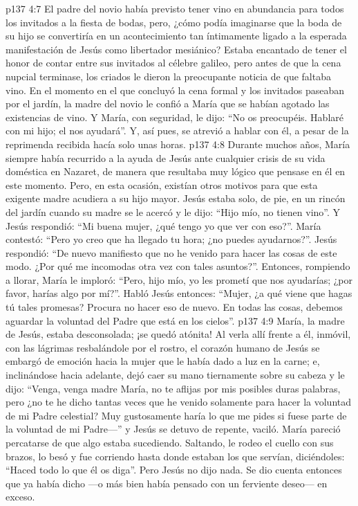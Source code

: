 \vs p137 4:7 \pc El padre del novio había previsto tener vino en abundancia para todos los invitados a la fiesta de bodas, pero, ¿cómo podía imaginarse que la boda de su hijo se convertiría en un acontecimiento tan íntimamente ligado a la esperada manifestación de Jesús como libertador mesiánico? Estaba encantado de tener el honor de contar entre sus invitados al célebre galileo, pero antes de que la cena nupcial terminase, los criados le dieron la preocupante noticia de que faltaba vino. En el momento en el que concluyó la cena formal y los invitados paseaban por el jardín, la madre del novio le confió a María que se habían agotado las existencias de vino. Y María, con seguridad, le dijo: “No os preocupéis. Hablaré con mi hijo; el nos ayudará”. Y, así pues, se atrevió a hablar con él, a pesar de la reprimenda recibida hacía solo unas horas.
\vs p137 4:8 Durante muchos años, María siempre había recurrido a la ayuda de Jesús ante cualquier crisis de su vida doméstica en Nazaret, de manera que resultaba muy lógico que pensase en él en este momento. Pero, en esta ocasión, existían otros motivos para que esta exigente madre acudiera a su hijo mayor. Jesús estaba solo, de pie, en un rincón del jardín cuando su madre se le acercó y le dijo: “Hijo mío, no tienen vino”. Y Jesús respondió: “Mi buena mujer, ¿qué tengo yo que ver con eso?”. María contestó: “Pero yo creo que ha llegado tu hora; ¿no puedes ayudarnos?”. Jesús respondió: “De nuevo manifiesto que no he venido para hacer las cosas de este modo. ¿Por qué me incomodas otra vez con tales asuntos?”. Entonces, rompiendo a llorar, María le imploró: “Pero, hijo mío, yo les prometí que nos ayudarías; ¿por favor, harías algo por mí?”. Habló Jesús entonces: “Mujer, ¿a qué viene que hagas tú tales promesas? Procura no hacer eso de nuevo. En todas las cosas, debemos aguardar la voluntad del Padre que está en los cielos”.
\vs p137 4:9 María, la madre de Jesús, estaba desconsolada; ¡se quedó atónita! Al verla allí frente a él, inmóvil, con las lágrimas resbalándole por el rostro, el corazón humano de Jesús se embargó de emoción hacia la mujer que le había dado a luz en la carne; e, inclinándose hacia adelante, dejó caer su mano tiernamente sobre su cabeza y le dijo: “Venga, venga madre María, no te aflijas por mis posibles duras palabras, pero ¿no te he dicho tantas veces que he venido solamente para hacer la voluntad de mi Padre celestial? Muy gustosamente haría lo que me pides si fuese parte de la voluntad de mi Padre---” y Jesús se detuvo de repente, vaciló. María pareció percatarse de que algo estaba sucediendo. Saltando, le rodeo el cuello con sus brazos, lo besó y fue corriendo hasta donde estaban los que servían, diciéndoles: “Haced todo lo que él os diga”. Pero Jesús no dijo nada. Se dio cuenta entonces que ya había dicho ---o más bien había pensado con un ferviente deseo--- en exceso.
